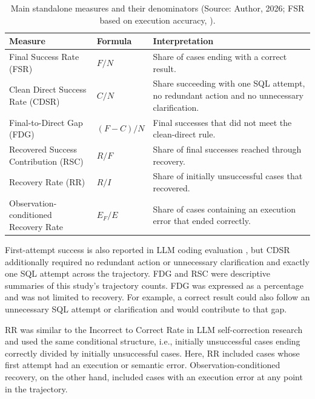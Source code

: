 \begin{table}[H]
\centering
{\small
\begin{tabularx}{\textwidth}{@{}>{\raggedright\arraybackslash}p{}l>{\raggedright\arraybackslash}X@{}}
\toprule
\textbf{Measure} & \textbf{Formula} & \textbf{Interpretation} \\
\midrule
Final Success Rate (FSR) & $F/N$ & Share of cases ending with a correct result. \\
\addlinespace[0.5em]
Clean Direct Success Rate (CDSR) & $C/N$ & Share succeeding with one SQL attempt, no redundant action and no unnecessary clarification. \\
\addlinespace[0.5em]
Final-to-Direct Gap (FDG) & $(F-C)/N$ & Final successes that did not meet the clean-direct rule. \\
\addlinespace[0.5em]
Recovered Success Contribution (RSC) & $R/F$ & Share of final successes reached through recovery. \\
\addlinespace[0.5em]
Recovery Rate (RR) & $R/I$ & Share of initially unsuccessful cases that recovered. \\
\addlinespace[0.5em]
Observation-conditioned Recovery Rate & $E_F/E$ & Share of cases containing an execution error that ended correctly. \\
\bottomrule
\end{tabularx}
}
\caption{Main standalone measures and their denominators (Source: Author, 2026;
FSR based on execution accuracy, \citealp{yu2018spider}).}
\label{tab:main-metrics}
\end{table}

First-attempt success is also reported in LLM coding evaluation
\citep{boominathan2026llm4ds}, but CDSR
additionally required no redundant action
or unnecessary clarification and exactly one SQL attempt across the trajectory.
FDG and RSC were descriptive summaries of this study's trajectory counts.
FDG was expressed as a percentage and was not limited to recovery.
For example, a correct result could also follow an unnecessary SQL attempt
or clarification and would contribute to that gap.

RR was similar to the Incorrect to Correct Rate in
LLM self-correction research \citep[Appendix E.3.1, Eq.~10]{ma2025s2r} and
used the same conditional structure, i.e.,
initially unsuccessful cases ending correctly divided by initially unsuccessful cases.
Here, RR included cases whose first attempt had an execution or semantic error.
Observation-conditioned recovery, on the other hand, included cases with an execution error
at any point in the trajectory.

